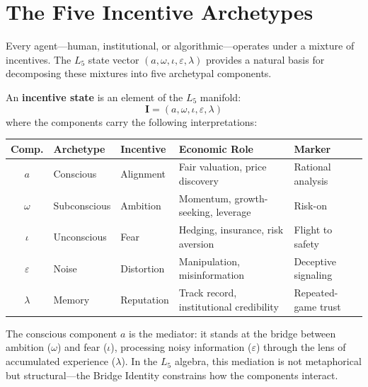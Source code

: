 
\section{The Five Incentive Archetypes}

Every agent---human, institutional, or algorithmic---operates under a mixture of incentives. The $L_5$ state vector $(a, \omega, \iota, \varepsilon, \lambda)$ provides a natural basis for decomposing these mixtures into five archetypal components.

\begin{definition}\label{def:incentive_state}
An \textbf{incentive state} is an element of the $L_5$ manifold:
\begin{equation}
    \mathbf{I} = (a, \omega, \iota, \varepsilon, \lambda)
\end{equation}
where the components carry the following interpretations:
\end{definition}

\begin{center}\small
\begin{tabular}{@{}cllp{5cm}l@{}}
\toprule
\textbf{Comp.} & \textbf{Archetype} & \textbf{Incentive} & \textbf{Economic Role} & \textbf{Marker} \\
\midrule
$a$ & Conscious & Alignment & Fair valuation, price discovery & Rational analysis \\
$\omega$ & Subconscious & Ambition & Momentum, growth-seeking, leverage & Risk-on \\
$\iota$ & Unconscious & Fear & Hedging, insurance, risk aversion & Flight to safety \\
$\varepsilon$ & Noise & Distortion & Manipulation, misinformation & Deceptive signaling \\
$\lambda$ & Memory & Reputation & Track record, institutional credibility & Repeated-game trust \\
\bottomrule
\end{tabular}
\end{center}

The conscious component $a$ is the mediator: it stands at the bridge between ambition ($\omega$) and fear ($\iota$), processing noisy information ($\varepsilon$) through the lens of accumulated experience ($\lambda$). In the $L_5$ algebra, this mediation is not metaphorical but structural---the Bridge Identity constrains how the components interact.


